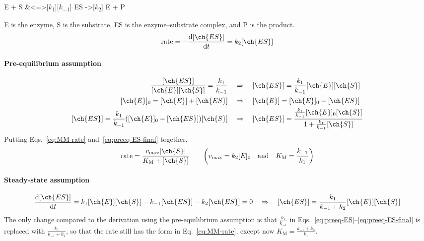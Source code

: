 \documentclass[11pt,a4paper,twoside]{article}
\numberwithin{equation}{section}
\newcommand{\eqn}[1]{Eq.~\eqref{#1}}
\newcommand{\eqs}[2]{Eqs.~\eqref{#1} and~\eqref{#2}}
\newcommand{\kn}[1]{$k$\textsubscript{$#1$}}
\begin{document}
\begin{reactions*}
    E + S  &<=>[\kn{1}][\kn{-1}] ES ->[\kn{2}] E + P
\end{reactions*}
E is the enzyme, S is the substrate, ES is the enzyme--substrate complex, and P is the product.
\begin{equation}
    \label{eq:MM-rate}
    \text{rate} = -\dv{[\ch{ES}]}{t} = k_2 [\ch{ES}]
\end{equation}

\paragraph{Pre-equilibrium assumption}

\begin{align}
    \frac{[\ch{ES}]}{[\ch{E}][\ch{S}]} = \frac{k_{1}}{k_{-1}} \quad & \Rightarrow \quad 
    [\ch{ES}] = \frac{k_{1}}{k_{-1}} [\ch{E}][\ch{S}]
    \label{eq:preeq-ES}
     \\
    [\ch{E}]_0 =  [\ch{E}] + [\ch{ES}] \quad & \Rightarrow \quad [\ch{E}] = [\ch{E}]_0 - [\ch{ES}] \\
    [\ch{ES}] = \frac{k_{1}}{k_{-1}} ([\ch{E}]_0 - [\ch{ES}]) [\ch{S}] 
    \quad & \Rightarrow \quad 
    [\ch{ES}] = \frac{\frac{k_1}{k_{-1}} [\ch{E}]_0 [\ch{S}]}{1 + \frac{k_1}{k_{-1}} [\ch{S}]}
    \label{eq:preeq-ES-final}
\end{align}
Putting \eqs{eq:MM-rate}{eq:preeq-ES-final} together,
\begin{gather}
    \text{rate} = \frac{v_{\text{max}} [\ch{S}]}{K_{\text{M}} + [\ch{S}]} \qquad
    \qty( v_{\text{max}} = k_2 [E]_{0} \qqtext{and}
    K_{\text{M}} = \frac{k_{-1}}{k_{1}} ) \label{eq:MM-rate-final}
\end{gather}

\paragraph{Steady-state assumption}

\begin{align}
\dv{[\ch{ES}]}{t} = k_1 [\ch{E}][\ch{S}] - k_{-1} [\ch{ES}] - k_{2} [\ch{ES}] = 0
\quad \Rightarrow \quad [\ch{ES}] = \frac{k_{1}}{k_{-1} + k_{2}} [\ch{E}] [\ch{S}]
\end{align}
The only change compared to the derivation using the pre-equilibrium assumption is that 
$\frac{k_1}{k_{-1}}$ in Eqs.~\eqref{eq:preeq-ES}--\eqref{eq:preeq-ES-final} is replaced with
$\frac{k_{1}}{k_{-1} + k_{2}}$, so that the rate still has the form in \eqn{eq:MM-rate}, except now $ K_{\text{M}} = \frac{k_{-1} + k_2}{k_{1}} $.
\end{document}
